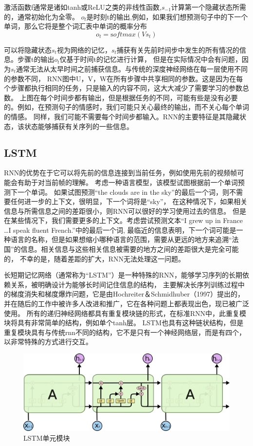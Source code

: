 激活函数f通常是诸如tanh或ReLU之类的非线性函数,$s_{-1}$计算第一个隐藏状态所需的，通常初始化为全零。
$o_{t}$是时刻t的输出,例如，如果我们想预测句子中的下一个单词，那么它将是整个词汇表中单词的概率分布
\begin{equation}
  o_t = \mathrm softmax (V s_t)
  \end{equation}

  可以将隐藏状态$s_{t}$视为网络的记忆，$s_{t}$捕获有关先前时间步中发生的所有情况的信息。步骤t的输出$o_{t}$仅基于时间t的记忆进行计算，
  但是在实际情况中会有问题，因为$s_{t}$通常无法从太早时间之前捕获信息。与传统的深度神经网络在每一层使用不同的参数不同，
  RNN图中U，V，W在所有步骤中共享相同的参数。这是因为在每个步骤都执行相同的任务，只是输入的内容不同，这大大减少了需要学习的参数总数。
  上图在每个时间步都有输出，但是根据任务的不同，可能有些是没有必要的。例如，在预测句子的情感时，我们可能只关心最终的输出，而不关心每个单词的情感。
  同样，我们可能不需要每个时间步都输入。RNN的主要特征是其隐藏状态，该状态能够捕获有关序列的一些信息。


  
\subsection{LSTM}
  RNN的优势在于它可以将先前的信息连接到当前任务，例如使用先前的视频帧可能会有助于对当前帧的理解。
  考虑一种语言模型，该模型试图根据前一个单词预测下一个单词。
  如果试图预测“the clouds are in the sky”的最后一个词，则不需要任何进一步的上下文，很明显，下一个词将是“sky”，
  在这种情况下，如果相关信息与所需信息之间的差距很小，则RNN可以很好的学习使用过去的信息。
  但是在某些情况下，我们需要更多的上下文。考虑尝试预测文本“I grew up in France \dots I speak fluent French.”中的最后一个词,
  最临近的信息表明，下一个词可能是一种语言的名称，但是如果想缩小哪种语言的范围，需要从更远的地方来追溯“法国”的信息。相关信息与这些相关信息被需要的地方之间的差距很大是完全可能的，
不幸的是，随着差距的扩大，RNN无法处理这一问题。

长短期记忆网络（通常称为“LSTM”）是一种特殊的RNN，能够学习序列的长期依赖关系，被明确设计为能够长时间记住信息的结构，
主要解决长序列训练过程中的梯度消失和梯度爆炸问题，它是由Hochreiter＆Schmidhuber（1997）提出的，
并在随后的工作中被许多人改进和推广，它在各种问题上都表现出色，现已被广泛使用。
所有的递归神经网络都具有重复模块链的形式，在标准RNN中，此重复模块将具有非常简单的结构，例如单个tanh层。
LSTM也具有这种链状结构，但是重复模块具有与传统rnn不同的结构，它不是只有一个神经网络层，而是有四个，以非常特殊的方式进行交互。

\begin{figure}[htbp]
  \centering
  \includegraphics[scale=0.5]{./images/LSTM.jpg}
  \caption{LSTM单元模块\cite{sundermeyer2012lstm}}
  \label{fig:LSTM}
\end{figure}

